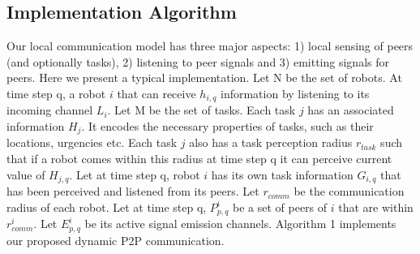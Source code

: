 \documentclass[letterpaper, 10 pt, times, conference]{ieeeconf} %
\begin{document}
\subsection{Implementation Algorithm}
Our local communication model has three major aspects: 1) local sensing of peers (and optionally tasks), 2) listening to peer signals and 3) emitting signals for peers. Here we present a typical implementation.
Let N be the set of robots. At time step q, a robot $i$ that can receive $h_{i,q}$ information by listening to its incoming channel $L_i$. Let M be the set of tasks. Each task $j$ has an associated information $H_j$. It encodes the necessary properties of tasks, such as their locations, urgencies etc. Each task $j$ also has a task perception radius $r_{task}$ such that if a robot comes within this radius at time step q it can perceive current value of $H_{j,q}$. Let at time step q, robot $i$ has its own task information $G_{i, q}$ that has been perceived and listened from its peers. Let $r_{comm}$ be the communication radius of each robot. Let at time step q, $P_{p, q}^{i}$ be a set of peers of $i$ that are within $r_{comm}^{i}$. Let $E_{p, q}^{i}$ be its active signal emission channels. Algorithm 1
implements our proposed dynamic P2P communication.\\  
\end{document}
